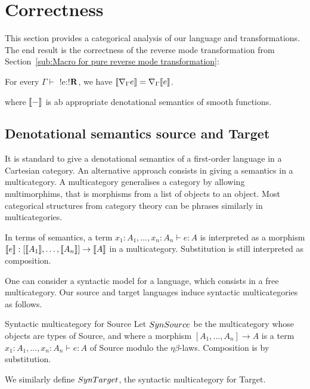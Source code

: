 \section{Correctness}
\label{sec:correctness}

This section provides a categorical analysis of our language and transformations.
The end result is the correctness of the reverse mode transformation from Section~\ref{sub:Macro for pure reverse mode transformation}:

 \begin{theorem}
     For every $\Gamma \vdash$ !e:!$\mathbf{R}$, we have 
     $\llbracket \nabla_\Gamma e\rrbracket= \nabla_\Gamma\llbracket e\rrbracket$.
 \end{theorem}
where $\llbracket -\rrbracket$ is ab appropriate denotational semantics of smooth functions.

\subsection{Denotational semantics source and Target} %
\label{sub:Denotational semantics source and Target}

It is standard to give a denotational semantics of a first-order language in a Cartesian category.
An alternative approach consists in giving a semantics in a multicategory.
A multicategory generalises a category by allowing multimorphims, that is morphisms from a list of objects to an object.
Most categorical structures from category theory can be phrases similarly in multicategories.

In terms of semantics, a term $x_1:A_1,\ldots,x_n:A_n\vdash e:A$ is interpreted as a morphism $\llbracket e\rrbracket:[\llbracket A_1\rrbracket,\ldots,\llbracket A_n\rrbracket]\to \llbracket A\rrbracket$ in a multicategory.
Substitution is still interpreted as composition. 

One can consider a syntactic model for a language, which consists in a free multicategory.
Our source and target languages induce syntactic multicategories as follows.

\begin{definition}{Syntactic multicategory for Source}
    Let $SynSource$ be the multicategory whose objects are types of Source, and where a morphism 
    $[A_1,\ldots,A_n]\to A$ is a term $x_1:A_1,\ldots,x_n:A_n\vdash e:A$ of Source modulo the $\eta\beta$-laws.
    Composition is by substitution.
\end{definition}

We similarly define $SynTarget$, the syntactic multicategory for Target.

